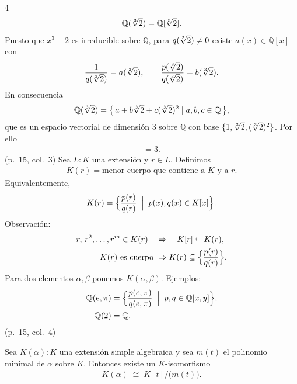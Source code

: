\documentclass[landscape,a4paper]{article}
\begin{document}
\begin{multicols}{4}
\begin{align*}
  \mathbb{Q}(\root 3 \of 2)=\mathbb{Q}[\root 3 \of 2].
\end{align*}
Puesto que $x^{3}-2$ es irreducible sobre $\mathbb{Q}$, para $q(\root 3 \of 2)\neq0$ existe $a(x)\in\mathbb{Q}[x]$ con
\begin{align*}
  \frac{1}{q(\root 3 \of 2)}=a(\root 3 \of 2),\qquad\frac{p(\root 3 \of 2)}{q(\root 3 \of 2)}=b(\root 3 \of 2).
\end{align*}
En consecuencia
\begin{align*}
  \mathbb{Q}(\root 3 \of 2)=\bigl\{\,a + b\root 3 \of 2 + c(\root 3 \of 2)^{2}\mid a,b,c\in\mathbb{Q}\,\bigr\},
\end{align*}
que es un espacio vectorial de dimensión $3$ sobre $\mathbb{Q}$ con base $\{1,\root 3 \of 2,(\root 3 \of 2)^{2}\}$.  Por ello
\begin{align*}
  [\mathbb{Q}(\root 3 \of 2):\mathbb{Q}]=3.
\end{align*}
(p.~15, col.~3)
Sea $L:K$ una extensión y $r\in L$.  Definimos
\begin{align*}
  K(r)=\text{menor cuerpo que contiene a }K\text{ y a }r.
\end{align*}
Equivalentemente,
\begin{align*}
  K(r)=\Bigl\{\frac{p(r)}{q(r)}\;\Bigm|\;p(x),q(x)\in K[x]\Bigr\}.
\end{align*}
Observación:
\begin{align*}
  r,\,r^{2},\ldots, r^{m}\in K(r)\quad&\Rightarrow\quad K[r]\subseteq K(r),\\
  K(r)\text{ es cuerpo }&\Rightarrow K(r)\subseteq\Bigl\{\frac{p(r)}{q(r)}\Bigr\}.
\end{align*}
Para dos elementos $\alpha,\beta$ ponemos $K(\alpha,\beta)$.  Ejemplos:
\begin{align*}
  \mathbb{Q}(e,\pi)&=\Bigl\{\frac{p(e,\pi)}{q(e,\pi)}\;\Bigm|\;p,q\in\mathbb{Q}[x,y]\Bigr\},\\
  \mathbb{Q}(2)&=\mathbb{Q}.
\end{align*}
(p.~15, col.~4)
\begin{tcolorbox}[colback=white,colframe=red!80!black,colbacktitle=red!80!black,coltitle=white,title={Teorema: Extensiones simples algebraicas (p.~16, col.~1)}]
Sea $K(\alpha):K$ una extensión simple algebraica y sea $m(t)$ el polinomio minimal de $\alpha$ sobre $K$. Entonces existe un $K$-isomorfismo
\begin{align*}
  K(\alpha)\;\cong\;K[t]\big/\bigl(m(t)\bigr).
\end{align*}

\end{tcolorbox}
\end{multicols}
\end{document}
